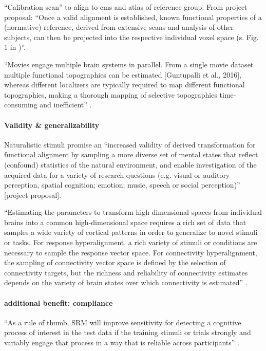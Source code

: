 ``Calibration scan'' to align to \ac{cms} and atlas of reference group.
%
From project proposal: ``Once a valid alignment is established, known functional
properties of a (normative) reference, derived from extensive scans and analysis
of other subjects, can then be projected into the respective individual voxel
space (s.  Fig. 1 in \citep{nishimoto2016lining})''.

%
``Movies engage multiple brain systems in parallel. From a single movie dataset
multiple functional topographies can be estimated [Guntupalli et al., 2016],
whereas different localizers are typically required to map different functional
topographies, making a thorough mapping of selective topographies time-consuming
and inefficient'' \citep{jiahui2020predicting}.


\paragraph{Validity \& generalizability}

Naturalistic stimuli promise an ``increased validity of derived transformation
for functional alignment by sampling a more diverse set of mental states that
reflect (confound) statistics of the natural environment, and enable
investigation of the acquired data for a variety of research questions (e.g.
visual or auditory perception, spatial cognition; emotion; music, speech or
social perception)'' [project proposal].

``Estimating the parameters to transform high-dimensional spaces from individual
brains into a common high-dimensional space requires a rich set of data that
samples a wide variety of cortical patterns in order to generalize to novel
stimuli or tasks. For response hyperalignment, a rich variety of stimuli or
conditions are necessary to sample the response vector space. For connectivity
hyperalignment, the sampling of connectivity vector space is defined by the
selection of connectivity targets, but the richness and reliability of
connectivity estimates depends on the variety of brain states over which
connectivity is estimated'' \citep{haxby2020hyperalignment}.


\paragraph{additional benefit: compliance}
%
``As a rule of thumb, SRM will improve sensitivity for detecting a cognitive
process of interest in the test data if the training stimuli or trials strongly
and variably engage that process in a way that is reliable across participants''
\citep{cohen2017computational}.

